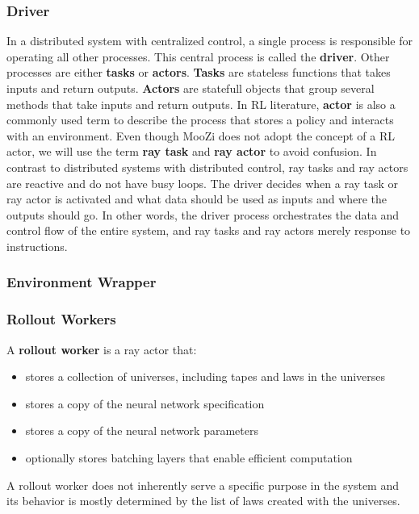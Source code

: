 \documentclass[12pt]{article}
\begin{document}
\subsubsection{Driver}
In a distributed system with centralized control, a single process is responsible for operating all other processes.
This central process is called the \textbf{driver}.
Other processes are either \textbf{tasks} or \textbf{actors}.
\textbf{Tasks} are stateless functions that takes inputs and return outputs.
\textbf{Actors} are statefull objects that group several methods that take inputs and return outputs.
In RL literature, \textbf{actor} is also a commonly used term to describe the process that stores a policy and interacts with an environment.
Even though MooZi does not adopt the concept of a RL actor, we will use the term \textbf{ray task} and \textbf{ray actor} to avoid confusion.
In contrast to distributed systems with distributed control, ray tasks and ray actors are reactive and do not have busy loops.
The driver decides when a ray task or ray actor is activated and what data should be used as inputs and where the outputs should go.
In other words, the driver process orchestrates the data and control flow of the entire system, and ray tasks and ray actors merely response to instructions.

\subsubsection{Environment Wrapper}

\subsubsection{Rollout Workers}
A \textbf{rollout worker} is a ray actor that:
\begin{itemize}
    \item stores a collection of universes, including tapes and laws in the universes
    \item stores a copy of the neural network specification
    \item stores a copy of the neural network parameters
    \item optionally stores batching layers that enable efficient computation
\end{itemize}

A rollout worker does not inherently serve a specific purpose in the system and its behavior is mostly determined by the list of laws created with the universes.
\end{document}
